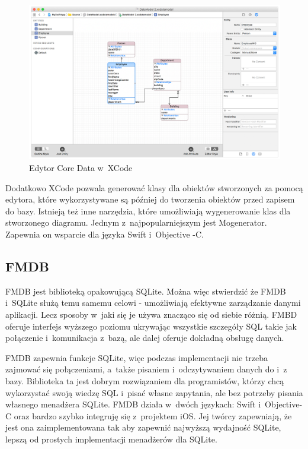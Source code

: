 \begin{figure}[h]
	\includegraphics[width=\linewidth]{img/Entity_Inheritence_2_2x.png}
	\caption{Edytor Core Data w~XCode}
	\label{fig: CoreDataEdytor}
\end{figure}

Dodatkowo XCode pozwala generować klasy dla obiektów stworzonych za pomocą edytora, które wykorzystywane są później do tworzenia obiektów przed zapisem do bazy. Istnieją też inne narzędzia, które umożliwiają wygenerowanie klas dla stworzonego diagramu. Jednym z~najpopularniejszym jest Mogenerator. Zapewnia on wsparcie dla języka Swift i~Objective -C.

\newpage
\subsection{FMDB}

FMDB jest biblioteką opakowującą SQLite. Można więc stwierdzić że FMDB i~SQLite służą temu samemu celowi - umożliwiają efektywne zarządzanie danymi aplikacji. Lecz sposoby w~jaki się je używa znacząco się od siebie różnią. FMBD oferuje interfejs wyższego poziomu ukrywając wszystkie szczegóły SQL takie jak połączenie i~komunikacja z~bazą, ale dalej oferuje dokładną obsługę danych. \par 
FMDB zapewnia funkcje SQLite, więc podczas implementacji nie trzeba zajmować się połączeniami, a~także pisaniem i~odczytywaniem danych do i~z bazy. Biblioteka ta jest dobrym rozwiązaniem dla programistów, którzy chcą wykorzystać swoją wiedzę SQL i~pisać własne zapytania, ale bez potrzeby pisania własnego menadżera SQLite. FMDB działa w~dwóch językach: Swift i~Objective-C oraz bardzo szybko integruję się z~projektem iOS. Jej twórcy zapewniają, że jest ona zaimplementowana tak aby zapewnić najwyższą wydajność SQLite, lepszą od prostych implementacji menadżerów dla SQLite. \par

